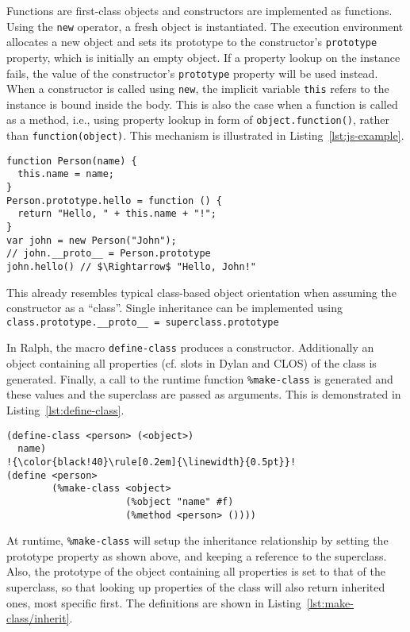 \documentclass{acm_proc_article-sp}
\begin{document}
Functions are first-class objects and constructors are implemented as
functions. Using the \texttt{new} operator, a fresh object is
instantiated. The execution environment allocates a new object and
sets its prototype to the constructor's \texttt{prototype} property,
which is initially an empty object. If a property lookup on the
instance fails, the value of the constructor's \texttt{prototype}
property will be used instead. When a constructor is called
using \texttt{new}, the implicit variable \texttt{this} refers to the
instance is bound inside the body. This is also the case when a
function is called as a method, i.e., using property lookup in form of
\texttt{object.function()}, rather than
\texttt{function(object)}. This mechanism is illustrated in
Listing~\ref{lst:js-example}.

\begin{lstlisting}[label=lst:js-example,caption=Using prototypes in JavaScript]
function Person(name) {
  this.name = name;
}
Person.prototype.hello = function () {
  return "Hello, " + this.name + "!";
}
var john = new Person("John");
// john.__proto__ = Person.prototype
john.hello() // $\Rightarrow$ "Hello, John!"
\end{lstlisting}

This already resembles typical class-based object orientation when
assuming the constructor as a ``class''.  Single inheritance can be
implemented using \\
\lstinline{class.prototype.__proto__ = superclass.prototype}

In Ralph, the macro \texttt{define-class} produces a constructor.
Additionally an object containing all properties (cf. slots in Dylan
and CLOS) of the class is generated. Finally, a call to the
runtime function \texttt{\%make-class} is generated and these values
and the superclass are passed as arguments. This is demonstrated in
Listing~\ref{lst:define-class}.

\begin{lstlisting}[label=lst:define-class,
    caption=Code produced by macro \texttt{define-class},
    escapechar=!
]
(define-class <person> (<object>)
  name)
!{\color{black!40}\rule[0.2em]{\linewidth}{0.5pt}}!
(define <person>
        (%make-class <object>
                     (%object "name" #f)
                     (%method <person> ())))
\end{lstlisting}

At runtime, \texttt{\%make-class} will setup the inheritance
relationship by setting the prototype property as shown above, and
keeping a reference to the superclass. Also, the prototype of the
object containing all properties is set to that of the superclass, so
that looking up properties of the class will also return inherited
ones, most specific first. The definitions are shown in
Listing~\ref{lst:make-class/inherit}.
\end{document}
